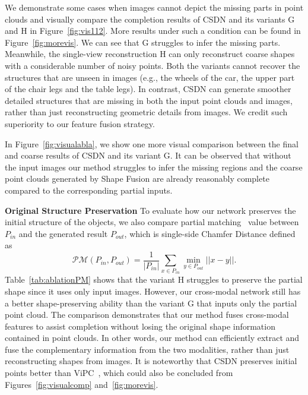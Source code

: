 We demonstrate some cases when images cannot depict the missing parts in point clouds and visually compare the completion results of CSDN and its variants G and H in Figure~\ref{fig:vis112}. More results under such a condition can be found in Figure~\ref{fig:morevis}. 
We can see that G struggles to infer the missing parts. Meanwhile, the single-view reconstruction H can only reconstruct coarse shapes with a considerable number of noisy points. Both the variants cannot recover the structures that are unseen in images (e.g., the wheels of the car, the upper part of the chair legs and the table legs). 
In contrast, CSDN can generate smoother detailed structures that are missing in both the input point clouds and images, rather than just reconstructing geometric details from images. We credit such superiority to our feature fusion strategy.

In Figure~\ref{fig:visualabla}, we show one more visual comparison between the final and coarse results of CSDN and its variant G. It can be observed that without the input images our method struggles to infer the missing regions and the coarse point clouds generated by Shape Fusion are already reasonably complete compared to the corresponding partial inputs.

\textbf{Original Structure Preservation}
To evaluate how our network preserves the initial structure of the objects, we also compare partial matching~\cite{wen2021cycle4completion} value between $P_{in}$ and the generated result $P_{out}$, which is single-side Chamfer Distance defined as
\begin{equation}
    \mathcal{PM}(P_{in},P_{out})=\frac{1}{\lvert P_{in} \rvert}\sum_{x \in P_{in}}\min_{y \in P_{out}} \lvert \lvert x-y \rvert \rvert.
\end{equation}
Table~\ref{tab:ablationPM} shows that the variant H struggles to preserve the partial shape since it uses only input images. 
However, our cross-modal network still has a better shape-preserving ability than the variant G that inputs only the partial point cloud. The comparison demonstrates that our method fuses cross-modal features to assist completion without losing the original shape information contained in point clouds. In other words, our method can efficiently extract and fuse the complementary information from the two modalities, rather than just reconstructing shapes from images. 
It is noteworthy that CSDN preserves initial points better than ViPC~\cite{zhang2021view}, which could also be concluded from Figures~\ref{fig:visualcomp} and~\ref{fig:morevis}.

